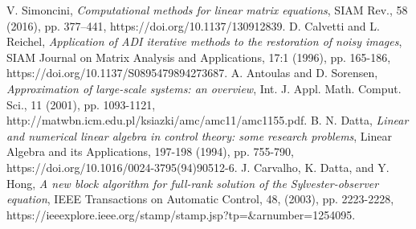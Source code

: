 \documentclass{article}
\begin{document}
\begin{thebibliography}{3}
 {\sc V. Simoncini}, {\em Computational methods for linear matrix equations}, SIAM Rev., 58 (2016), pp. 377–441, https://doi.org/10.1137/130912839.
{\sc D. Calvetti and L. Reichel}, {\em Application of ADI iterative methods to the restoration of noisy images}, SIAM Journal on Matrix Analysis and Applications, 17:1 (1996), pp. 165-186,
https://doi.org/10.1137/S0895479894273687.
 {\sc A. Antoulas and D. Sorensen}, {\em Approximation of large-scale systems: an overview}, Int. J. Appl. Math. Comput. Sci., 11 (2001), pp. 1093-1121,  http://matwbn.icm.edu.pl/ksiazki/amc/amc11/amc1155.pdf.
 {\sc B. N. Datta}, {\em Linear and numerical linear algebra in control theory: some research problems}, Linear Algebra and its Applications, 197-198 (1994), pp. 755-790, https://doi.org/10.1016/0024-3795(94)90512-6.
 {\sc J. Carvalho, K. Datta, and Y. Hong}, {\em A new block algorithm for full-rank solution of the Sylvester-observer equation}, IEEE Transactions on Automatic Control, 48, (2003), pp. 2223-2228, https://ieeexplore.ieee.org/stamp/stamp.jsp?tp=\&arnumber=1254095.
\end{thebibliography}
\end{document}
